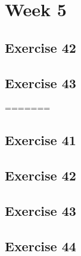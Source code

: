 \documentclass[a4paper]{article}
\let\stdsection\section
\renewcommand\section{\newpage\stdsection}
\begin{document}
\section*{Week 5}

\subsection*{Exercise 42}
















\subsection*{Exercise 43}
=======
\newpage
\subsection*{Exercise 41}


\newpage
\subsection*{Exercise 42}

\newpage
\subsection*{Exercise 43}


\newpage
\subsection*{Exercise 44}





\end{document}
